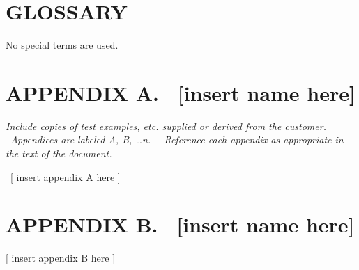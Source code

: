 \section[GLOSSARY]{\bfseries\color{black} GLOSSARY}
{\color{black}

  No special terms are used.

}



\clearpage\setcounter{page}{1}\pagestyle{Convertviii}
\section[APPENDIX A. \ [insert name
here{]}]{\bfseries\color{black} APPENDIX A.
\ [insert name here]}
{\itshape\color{black}
Include copies of test examples, etc. supplied or
derived from the customer. \ Appendices are labeled A, B, {\dots}n.
\ \ Reference each appendix as appropriate in the text of the document.
}

{\color{black}
\ [ insert appendix A here ]}

\clearpage\setcounter{page}{1}\pagestyle{Convertix}
\section[APPENDIX B. \ [insert name
here{]}]{\bfseries\color{black} APPENDIX B.
\ [insert name here]}

\bigskip

{\color{black}
[ insert appendix B here ]}


\bigskip

